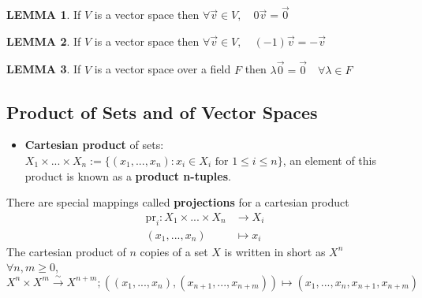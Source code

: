 \documentclass[12pt]{article}
\theoremstyle{definition}
\newtheorem{lemma}{LEMMA}[subsection]
\begin{document}
\begin{lemma}
    If $V$ is a vector space then $\forall \overrightarrow{v} \in V,\quad 0\overrightarrow{v} = \overrightarrow{0}$
\end{lemma}
\begin{lemma}
    If $V$ is a vector space then $\forall \overrightarrow{v} \in V, \quad (-1)\overrightarrow{v} = -\overrightarrow{v}$
\end{lemma}
\begin{lemma}
    If $V$ is a vector space over a field $F$ then $\lambda\overrightarrow{0} = \overrightarrow{0} \quad \forall \lambda\in F$
\end{lemma}

\subsection{Product of Sets and of Vector Spaces}
\begin{itemize}
    \item
          \textbf{Cartesian product} of sets: $X_1 \times ... \times X_n := \{(x_1,...,x_n):x_i\in X_i \text{ for } 1 \leq i \leq n\}$, an element of this product is known as a \textbf{product n-tuples}.\newline
\end{itemize}
There are special mappings called \textbf{projections} for a cartesian product
\[\begin{split}
        \text{pr}_i: X_1\times ... \times X_n &\rightarrow X_i\\
        (x_1,...,x_n) &\mapsto x_i
    \end{split}\]
The cartesian product of $n$ copies of a set $X$ is written in short as $X^n$\\

$\forall n,m \geq 0$, $X^n\times X^m\xrightarrow{\sim} X^{n+m}; ((x_1,...,x_n),(x_{n+1},...,x_{n+m}))\mapsto(x_1,...,x_n,x_{n+1},x_{n+m})$

\end{document}
